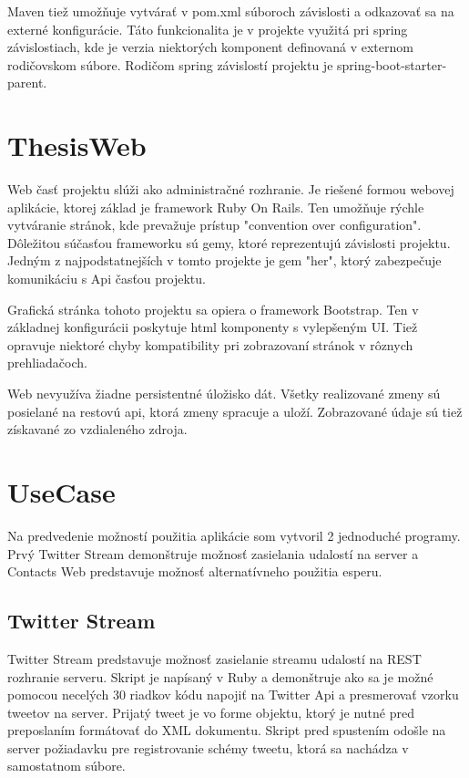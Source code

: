 		Maven tiež umožňuje vytvárať v pom.xml súboroch závislosti a odkazovať sa na externé konfigurácie. Táto funkcionalita je v projekte využitá pri spring závislostiach, kde je verzia niektorých komponent definovaná v externom rodičovskom súbore. Rodičom spring závislostí projektu je spring-boot-starter-parent.
		

\section{ThesisWeb}
	Web časť projektu slúži ako administračné rozhranie. Je riešené formou webovej aplikácie, ktorej základ je framework Ruby On Rails. Ten umožňuje rýchle vytváranie stránok, kde prevažuje prístup "convention over configuration". Dôležitou súčasťou frameworku sú gemy, ktoré reprezentujú závislosti projektu. Jedným z najpodstatnejších v tomto projekte je gem "her", ktorý zabezpečuje komunikáciu s Api časťou projektu.
	
	Grafická stránka tohoto projektu sa opiera o framework Bootstrap. Ten v základnej konfigurácii poskytuje html komponenty s vylepšeným UI. Tiež opravuje niektoré chyby kompatibility pri zobrazovaní stránok v rôznych prehliadačoch.
	
	Web nevyužíva žiadne persistentné úložisko dát. Všetky realizované zmeny sú posielané na restovú api, ktorá zmeny spracuje a uloží. Zobrazované údaje sú tiež získavané zo vzdialeného zdroja.
		
\section{UseCase}
	Na predvedenie možností použitia aplikácie som vytvoril 2 jednoduché programy. Prvý Twitter Stream demonštruje možnosť zasielania udalostí na server a Contacts Web predstavuje možnosť alternatívneho použitia esperu. 
	
	\subsection{Twitter Stream}
	Twitter Stream predstavuje možnosť zasielanie streamu udalostí na REST rozhranie serveru. Skript je napísaný v Ruby a demonštruje ako sa je možné pomocou necelých 30 riadkov kódu napojiť na Twitter Api a presmerovať vzorku tweetov na server. Prijatý tweet je vo forme objektu, ktorý je nutné pred preposlaním formátovať do XML dokumentu. Skript pred spustením odošle na server požiadavku pre registrovanie schémy tweetu, ktorá sa nachádza v samostatnom súbore.
	
